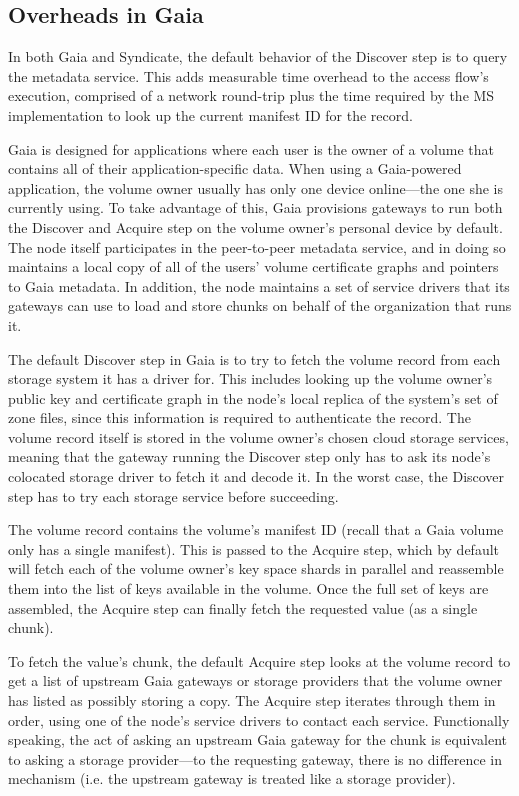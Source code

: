 \subsection{Overheads in Gaia}

In both Gaia and Syndicate, the default behavior of the Discover step is to query the
metadata service.  This adds measurable time overhead to the access flow's
execution, comprised of a network round-trip plus the time required by the MS
implementation to look up the current manifest ID for the record.

Gaia is designed for applications where each user is the owner of a volume that
contains all of their application-specific data.
When using a Gaia-powered application, the volume owner usually
has only one device online---the one she is
currently using.  To take advantage of this, Gaia provisions gateways to run 
both the Discover and Acquire step on the volume owner's personal device by
default.  The node itself participates in the peer-to-peer metadata service,
and in doing so maintains a local copy
of all of the users' volume certificate graphs and pointers to Gaia metadata.
In addition, the node maintains a set of service drivers that its gateways can use to load and store
chunks on behalf of the organization that runs it.

The default Discover step in Gaia is to try to fetch the volume record from each
storage system it has a driver for.  This includes
looking up the volume owner's public key and 
certificate graph in the node's local replica of
the system's set of zone files, since this information is required to
authenticate the record.  The volume record itself is stored in the volume
owner's chosen cloud storage services, meaning that the gateway running the
Discover step only has to ask its
node's colocated storage driver to fetch it and decode it.  In the worst case,
the Discover step has to try each storage service before succeeding.

The volume record contains the volume's manifest ID (recall that a Gaia volume
only has a single manifest).  This is passed to the Acquire step, which by
default will fetch each of the volume owner's key space shards in parallel and
reassemble them into the list of keys available in the volume.  Once the full
set of keys are assembled, the Acquire step can finally fetch the requested
value (as a single chunk).

To fetch the value's chunk, the default Acquire step looks at the volume record
to get a list of upstream Gaia gateways or storage providers that the volume
owner has listed as possibly storing a copy.  The Acquire step iterates through
them in order, using one of the node's service drivers to contact each service.
Functionally speaking, the act of asking an upstream Gaia gateway for the chunk is 
equivalent to asking a storage provider---to the requesting
gateway, there is no difference in mechanism (i.e. the upstream gateway is
treated like a storage provider).

